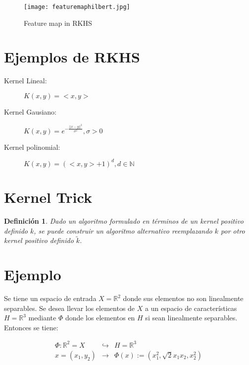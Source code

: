 \documentclass[12pt]{article}
\newtheorem*{mydef}{Definición}
\begin{document}






\begin{figure}[ht!]
\centering
\texttt{[image: featuremaphilbert.jpg]}
\caption{Feature map in RKHS}
\label{overflow}
\end{figure}

\section{Ejemplos de RKHS}

\begin{description}
\item[Kernel Lineal:] $K(x,y) = <x,y>$

\item[Kernel Gausiano:] $K(x,y) = e^{-\frac{||x-y||^2}{\sigma^2}}, \sigma > 0$

\item[Kernel polinomial:] $K(x,y) = (<x,y>+1)^d, d \in \mathbb{N}$

\end{description}


\section{Kernel Trick}

\begin{mydef}
Dado un algoritmo formulado en términos de un kernel positivo definido $k$, se puede construir un algoritmo alternativo reemplazando $k$ por otro kernel positivo definido $\tilde{k}$.
\end{mydef}




\newpage
\section{Ejemplo}

Se tiene un espacio de entrada $X=\mathbb{R}^2$ donde sus elementos no son linealmente separables. Se desea llevar los elementos de $X$ a un espacio de características $H=\mathbb{R}^3$ mediante $\Phi$ donde los elementos en $H$ si sean linealmente separables. Entonces se tiene:

\begin{eqnarray*}
\Phi: \mathbb{R}^2=X &\hookrightarrow &H=\mathbb{R}^3 \\
x=(x_1,y_2) &\rightarrow & \Phi(x):=(x_1^2,\sqrt{2}x_1 x_2,x_2^2)
\end{eqnarray*}
\end{document}
